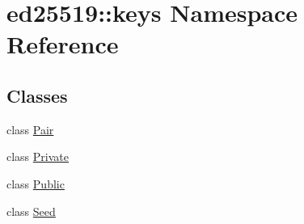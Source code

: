 \hypertarget{namespaceed25519_1_1keys}{}\section{ed25519\+:\+:keys Namespace Reference}
\label{namespaceed25519_1_1keys}
\subsection*{Classes}
\begin{DoxyCompactItemize}
\item 
class \mbox{\hyperlink{classed25519_1_1keys_1_1_pair}{Pair}}
\item 
class \mbox{\hyperlink{classed25519_1_1keys_1_1_private}{Private}}
\item 
class \mbox{\hyperlink{classed25519_1_1keys_1_1_public}{Public}}
\item 
class \mbox{\hyperlink{classed25519_1_1keys_1_1_seed}{Seed}}
\end{DoxyCompactItemize}
